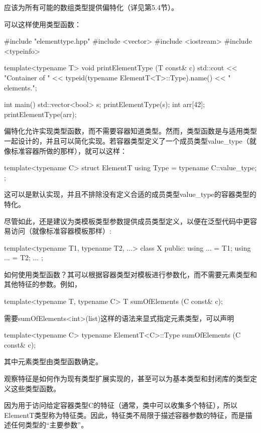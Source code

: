 应该为所有可能的数组类型提供偏特化（详见第5.4节）。

可以这样使用类型函数：

\begin{cpp}
#include "elementtype.hpp"
#include <vector>
#include <iostream>
#include <typeinfo>

template<typename T>
void printElementType (T const& c) {
	std::cout << "Container of "
	<< typeid(typename ElementT<T>::Type).name()
	<< " elements.\n";
}

int main() {
	std::vector<bool> s;
	printElementType(s);
	int arr[42];
	printElementType(arr);
}
\end{cpp}

偏特化允许实现类型函数，而不需要容器知道类型。然而，类型函数是与适用类型一起设计的，并且可以简化实现。若容器类型定义了一个成员类型value\_type（就像标准容器所做的那样），就可以这样：

\begin{cpp}
template<typename C>
struct ElementT {
	using Type = typename C::value_type;
};
\end{cpp}

这可以是默认实现，并且不排除没有定义合适的成员类型value\_type的容器类型的特化。

尽管如此，还是建议为类模板类型参数提供成员类型定义，以便在泛型代码中更容易访问（就像标准容器模板那样）:

\begin{cpp}
template<typename T1, typename T2, ...>
class X {
	public:
	using ... = T1;
	using ... = T2;
	...
};
\end{cpp}

如何使用类型函数？其可以根据容器类型对模板进行参数化，而不需要元素类型和其他特征的参数。例如，

\begin{cpp}
template<typename T, typename C>
T sumOfElements (C const& c);
\end{cpp}

需要sumOfElements<int>(list)这样的语法来显式指定元素类型，可以声明

\begin{cpp}
template<typename C>
typename ElementT<C>::Type sumOfElements (C const& c);
\end{cpp}

其中元素类型由类型函数确定。

观察特征是如何作为现有类型扩展实现的，甚至可以为基本类型和封闭库的类型定义这些类型函数。

因为用于访问给定容器类型C的特征（通常，类中可以收集多个特征），所以ElementT类型称为特征类。因此，特征类不局限于描述容器参数的特征，而是描述任何类型的“主要参数”。

